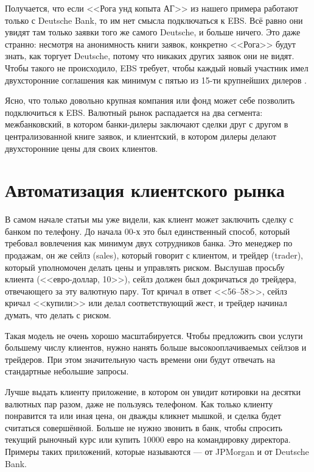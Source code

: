 Получается, что если <<Рога унд копыта АГ>> из нашего примера работают только с
Deutsche Bank, то им нет смысла подключаться к EBS. Всё равно они увидят там
только заявки того же самого Deutsche, и больше ничего. Это даже странно:
несмотря на анонимность книги заявок, конкретно <<Рога>> будут знать, как
торгует Deutsche, потому что никаких других заявок они не видят. Чтобы такого не
происходило, EBS требует, чтобы каждый новый участник имел двухсторонние
соглашения как минимум с пятью из 15-ти крупнейших дилеров \cite{cme2019elig}.

Ясно, что только довольно крупная компания или фонд может себе позволить
подключиться к EBS. Валютный рынок распадается на два сегмента: межбанковский, в
котором банки-дилеры заключают сделки друг с другом в централизованной книге
заявок, и клиентский, в котором дилеры делают двухсторонние цены для своих
клиентов.

\section*{Автоматизация клиентского рынка}

В самом начале статьи мы уже видели, как клиент может заключить сделку с банком
по телефону. До начала 00-х это был единственный способ, который требовал
вовлечения как минимум двух сотрудников банка. Это менеджер по продажам, он же
сейлз (sales), который говорит с клиентом, и трейдер (trader), который
уполномочен делать цены и управлять риском. Выслушав просьбу клиента
(<<евро-доллар, 10>>), сейлз должен был докричаться до трейдера, отвечающего за
эту валютную пару. Тот кричал в ответ <<56--58>>, сейлз кричал <<купили>> или
делал соответствующий жест, и трейдер начинал думать, что делать с риском.

Такая модель не очень хорошо масштабируется. Чтобы предложить свои услуги
большему числу клиентов, нужно нанять больше высокооплачиваемых сейлзов и
трейдеров. При этом значительную часть времени они будут отвечать на стандартные
небольшие запросы.

Лучше выдать клиенту приложение, в котором он увидит котировки на десятки
валютных пар разом, даже не пользуясь телефоном. Как только клиенту понравится
та или иная цена, он дважды кликнет мышкой, и сделка будет считаться
совершённой. Больше не нужно звонить в банк, чтобы спросить текущий рыночный
курс или купить \num{10000} евро на командировку директора. Примеры таких
приложений, которые называются  --- 
от JPMorgan и
 от Deutsche
Bank.

